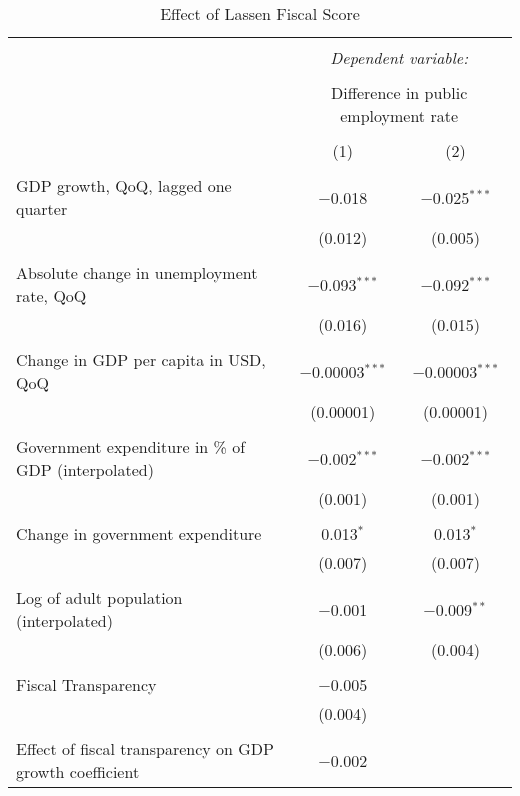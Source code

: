 
\begin{table}[!htbp] \centering 
  \caption{Effect of Lassen Fiscal Score} 
  \label{} 
\begin{tabular}{@{\extracolsep{5pt}}lcc} 
\\[-1.8ex]\hline 
\hline \\[-1.8ex] 
 & \multicolumn{2}{c}{\textit{Dependent variable:}} \\ 
\cline{2-3} 
\\[-1.8ex] & \multicolumn{2}{c}{Difference in public employment rate} \\ 
\\[-1.8ex] & (1) & (2)\\ 
\hline \\[-1.8ex] 
 GDP growth, QoQ, lagged one quarter & $-$0.018 & $-$0.025$^{***}$ \\ 
  & (0.012) & (0.005) \\ 
  & & \\ 
 Absolute change in unemployment rate, QoQ & $-$0.093$^{***}$ & $-$0.092$^{***}$ \\ 
  & (0.016) & (0.015) \\ 
  & & \\ 
 Change in GDP per capita in USD, QoQ & $-$0.00003$^{***}$ & $-$0.00003$^{***}$ \\ 
  & (0.00001) & (0.00001) \\ 
  & & \\ 
 Government expenditure in \% of GDP (interpolated) & $-$0.002$^{***}$ & $-$0.002$^{***}$ \\ 
  & (0.001) & (0.001) \\ 
  & & \\ 
 Change in government expenditure & 0.013$^{*}$ & 0.013$^{*}$ \\ 
  & (0.007) & (0.007) \\ 
  & & \\ 
 Log of adult population (interpolated) & $-$0.001 & $-$0.009$^{**}$ \\ 
  & (0.006) & (0.004) \\ 
  & & \\ 
 Fiscal Transparency & $-$0.005 &  \\ 
  & (0.004) &  \\ 
  & & \\ 
 Effect of fiscal transparency on GDP growth coefficient & $-$0.002 &  \\ 

\end{tabular}
\end{table}

